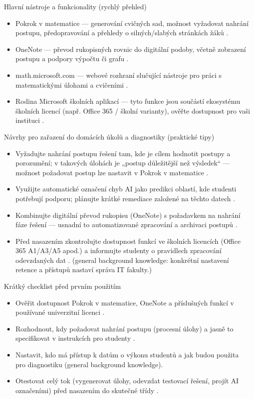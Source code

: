 \documentclass{report}%
\begin{document}
Hlavní nástroje a funkcionality (rychlý přehled)
\begin{itemize}
  \item Pokrok v matematice — generování cvičných sad, možnost vyžadovat nahrání postupu, předopravování a přehledy o silných/slabých stránkách žáků \cite{kb_ai_101_tipu_pdf_04e4a115_page_8_1}.
  \item OneNote — převod rukopisných rovnic do digitální podoby, včetně zobrazení postupu a podpory výpočtu či grafu \cite{kb_ai_101_tipu_pdf_04e4a115_page_8_1}.
  \item math.microsoft.com — webové rozhraní slučující nástroje pro práci s matematickými úlohami a cvičeními \cite{kb_ai_101_tipu_pdf_04e4a115_page_8_1}.
  \item Rodina Microsoft školních aplikací — tyto funkce jsou součástí ekosystému školních licencí (např. Office 365 / školní varianty), ověřte dostupnost pro vaši instituci \cite{kb_ai_101_tipu_pdf_04e4a115_page_3_1}.
\end{itemize}

Návrhy pro zařazení do domácích úkolů a diagnostiky (praktické tipy)
\begin{itemize}
  \item Vyžadujte nahrání postupu řešení tam, kde je cílem hodnotit postupy a porozumění; v takových úlohách je „postup důležitější než výsledek“ — možnost požadovat postup lze nastavit v Pokrok v matematice \cite{kb_ai_101_tipu_pdf_04e4a115_page_8_1}.
  \item Využijte automatické označení chyb AI jako predikci oblastí, kde studenti potřebují podporu; plánujte krátké remediace založené na těchto datech \cite{kb_ai_101_tipu_pdf_04e4a115_page_8_1}.
  \item Kombinujte digitální převod rukopisu (OneNote) s požadavkem na nahrání fáze řešení — usnadní to automatizované zpracování a archivaci postupů \cite{kb_ai_101_tipu_pdf_04e4a115_page_8_1}.
  \item Před nasazením zkontrolujte dostupnost funkcí ve školních licencích (Office 365 A1/A3/A5 apod.) a informujte studenty o pravidlech zpracování odevzdaných dat \cite{kb_ai_101_tipu_pdf_04e4a115_page_3_1}. (general background knowledge: konkrétní nastavení retence a přístupů nastaví správa IT fakulty.)
\end{itemize}

Krátký checklist před prvním použitím
\begin{itemize}
  \item Ověřit dostupnost Pokrok v matematice, OneNote a příslušných funkcí v používané univerzitní licenci \cite{kb_ai_101_tipu_pdf_04e4a115_page_3_1}.
  \item Rozhodnout, kdy požadovat nahrání postupu (procesní úlohy) a jasně to specifikovat v instrukcích pro studenty \cite{kb_ai_101_tipu_pdf_04e4a115_page_8_1}.
  \item Nastavit, kdo má přístup k datům o výkonu studentů a jak budou použita pro diagnostiku (general background knowledge).
  \item Otestovat celý tok (vygenerovat úlohy, odevzdat testovací řešení, projít AI označeními) před nasazením do skutečné třídy \cite{kb_ai_101_tipu_pdf_04e4a115_page_8_1}.
\end{itemize}
\end{document}
